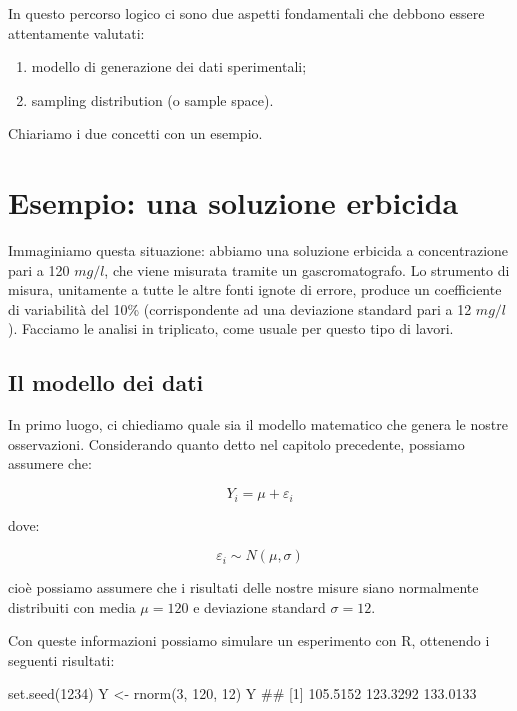 \documentclass[a4paper,12pt,oneside]{book}
\providecommand{\tightlist}{%
  \setlength{\itemsep}{0pt}\setlength{\parskip}{0pt}}
\newenvironment{Shaded}{}{}
\newcommand{\KeywordTok}[1]{#1}
\newcommand{\DecValTok}[1]{#1}
\newcommand{\StringTok}[1]{#1}
\newcommand{\CommentTok}[1]{#1}
\newcommand{\NormalTok}[1]{#1}
\begin{document}
In questo percorso logico ci sono due aspetti fondamentali che debbono essere attentamente valutati:

\begin{enumerate}
\def\labelenumi{\arabic{enumi}.}
\tightlist
\item
  modello di generazione dei dati sperimentali;
\item
  sampling distribution (o sample space).
\end{enumerate}

Chiariamo i due concetti con un esempio.

\hypertarget{esempio-una-soluzione-erbicida}{%
\section{Esempio: una soluzione erbicida}\label{esempio-una-soluzione-erbicida}}

Immaginiamo questa situazione: abbiamo una soluzione erbicida a concentrazione pari a 120 \(mg/l\), che viene misurata tramite un gascromatografo. Lo strumento di misura, unitamente a tutte le altre fonti ignote di errore, produce un coefficiente di variabilità del 10\% (corrispondente ad una deviazione standard pari a 12 \(mg/l\)). Facciamo le analisi in triplicato, come usuale per questo tipo di lavori.

\hypertarget{il-modello-dei-dati}{%
\subsection{Il modello dei dati}\label{il-modello-dei-dati}}

In primo luogo, ci chiediamo quale sia il modello matematico che genera le nostre osservazioni. Considerando quanto detto nel capitolo precedente, possiamo assumere che:

\[ Y_i = \mu + \varepsilon_i\]

dove:

\[ \varepsilon_i \sim N(\mu, \sigma)\]

cioè possiamo assumere che i risultati delle nostre misure siano normalmente distribuiti con media \(\mu = 120\) e deviazione standard \(\sigma = 12\).

Con queste informazioni possiamo simulare un esperimento con R, ottenendo i seguenti risultati:

\begin{Shaded}
\begin{Highlighting}[]
\KeywordTok{set.seed}\NormalTok{(}\DecValTok{1234}\NormalTok{)}
\NormalTok{Y <-}\StringTok{ }\KeywordTok{rnorm}\NormalTok{(}\DecValTok{3}\NormalTok{, }\DecValTok{120}\NormalTok{, }\DecValTok{12}\NormalTok{)}
\NormalTok{Y}
\CommentTok{## [1] 105.5152 123.3292 133.0133}
\end{Highlighting}
\end{Shaded}
\end{document}
